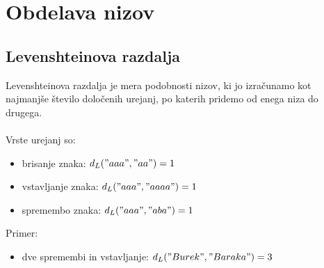 \documentclass[10pt,a4paper,oneside]{book}
\newenvironment{items}{
\begin{itemize}
  \setlength{\itemsep}{1pt}
  \setlength{\parskip}{0pt}
  \setlength{\parsep}{0pt}
}{\end{itemize}}
\begin{document}


\chapter{Obdelava nizov}
\section{Levenshteinova razdalja}
Levenshteinova razdalja je mera podobnosti nizov, ki jo izračunamo kot najmanjše število določenih urejanj, po katerih pridemo od enega niza do drugega.\\
\ \\
Vrste urejanj so:
\begin{items}
\item brisanje znaka: $d_L("aaa", "aa") = 1$
\item vstavljanje znaka: $d_L("aaa", "aaaa") = 1$
\item spremembo znaka: $d_L("aaa", "aba") = 1$
\end{items}
Primer:
\begin{items}
\item dve spremembi in vstavljanje: $d_L("Burek", "Baraka") = 3$
\end{items}

%
%
\end{document}
